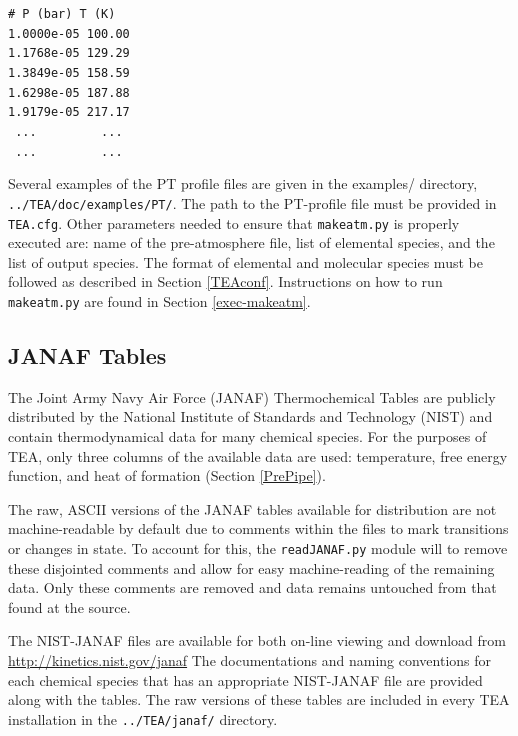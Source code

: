 {\small
\begin{tabbing}
\texttt{\# P  (bar)  T  (K)}\\
\texttt{1.0000e-05  100.00}\\
\texttt{1.1768e-05  129.29}\\
\texttt{1.3849e-05  158.59}\\
\texttt{1.6298e-05  187.88}\\
\texttt{1.9179e-05  217.17}\\
\texttt{ ...~~~~~~~~~...}\\
\texttt{ ...~~~~~~~~~...}
\end{tabbing}
\normalsize

Several examples of the PT profile files are given in the examples/
directory, \\ \texttt{../TEA/doc/examples/PT/}. The path to the
PT-profile file must be provided in \texttt{TEA.cfg}. Other parameters
needed to ensure that \texttt{makeatm.py} is properly executed are:
name of the pre-atmosphere file, list of elemental species, and the
list of output species. The format of elemental and molecular species
must be followed as described in Section \ref{TEAconf}.  Instructions
on how to run \texttt{makeatm.py} are found in
Section \ref{exec-makeatm}.

\subsection{JANAF Tables}
\label{JANAFSec}
  The Joint Army Navy Air Force (JANAF) Thermochemical Tables are
  publicly distributed by the National Institute of Standards and
  Technology (NIST) and contain thermodynamical data for many chemical
  species.  For the purposes of TEA, only three columns of the
  available data are used: temperature, free energy function, and heat
  of formation (Section \ref{PrePipe}).

  The raw, ASCII versions of the JANAF tables available for
  distribution are not machine-readable by default due to comments
  within the files to mark transitions or changes in state.  To
  account for this, the \texttt{readJANAF.py} module will to remove
  these disjointed comments and allow for easy machine-reading of the
  remaining data.  Only these comments are removed and data remains
  untouched from that found at the source.
  
  The NIST-JANAF files are available for both on-line viewing and
  download from \\ \href{http://kinetics.nist.gov/janafd} {\tttm
  http://kinetics.nist.gov/janaf} The documentations and naming
  conventions for each chemical species that has an appropriate
  NIST-JANAF file are provided along with the tables.  The raw
  versions of these tables are included in every TEA installation in
  the \texttt{../TEA/janaf/} directory.
  
}
